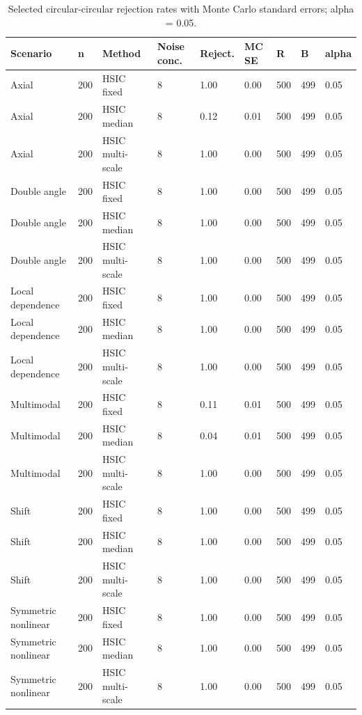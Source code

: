 \begin{table}[!htbp]
\centering
\scriptsize
\caption{Selected circular-circular rejection rates with Monte Carlo standard errors; alpha = 0.05.}
\label{tab:selected-power}
\begin{tabular}{lllllllll}
\toprule
Scenario & n & Method & Noise conc. & Reject. & MC SE & R & B & alpha
\\
\midrule
Axial & 200 & HSIC fixed & 8 & 1.00 & 0.00 & 500 & 499 & 0.05\\
Axial & 200 & HSIC median & 8 & 0.12 & 0.01 & 500 & 499 & 0.05\\
Axial & 200 & HSIC multi-scale & 8 & 1.00 & 0.00 & 500 & 499 & 0.05\\
Double angle & 200 & HSIC fixed & 8 & 1.00 & 0.00 & 500 & 499 & 0.05\\
Double angle & 200 & HSIC median & 8 & 1.00 & 0.00 & 500 & 499 & 0.05\\
Double angle & 200 & HSIC multi-scale & 8 & 1.00 & 0.00 & 500 & 499 & 0.05\\
Local dependence & 200 & HSIC fixed & 8 & 1.00 & 0.00 & 500 & 499 & 0.05\\
Local dependence & 200 & HSIC median & 8 & 1.00 & 0.00 & 500 & 499 & 0.05\\
Local dependence & 200 & HSIC multi-scale & 8 & 1.00 & 0.00 & 500 & 499 & 0.05\\
Multimodal & 200 & HSIC fixed & 8 & 0.11 & 0.01 & 500 & 499 & 0.05\\
Multimodal & 200 & HSIC median & 8 & 0.04 & 0.01 & 500 & 499 & 0.05\\
Multimodal & 200 & HSIC multi-scale & 8 & 1.00 & 0.00 & 500 & 499 & 0.05\\
Shift & 200 & HSIC fixed & 8 & 1.00 & 0.00 & 500 & 499 & 0.05\\
Shift & 200 & HSIC median & 8 & 1.00 & 0.00 & 500 & 499 & 0.05\\
Shift & 200 & HSIC multi-scale & 8 & 1.00 & 0.00 & 500 & 499 & 0.05\\
Symmetric nonlinear & 200 & HSIC fixed & 8 & 1.00 & 0.00 & 500 & 499 & 0.05\\
Symmetric nonlinear & 200 & HSIC median & 8 & 1.00 & 0.00 & 500 & 499 & 0.05\\
Symmetric nonlinear & 200 & HSIC multi-scale & 8 & 1.00 & 0.00 & 500 & 499 & 0.05\\
\bottomrule
\end{tabular}
\end{table}
